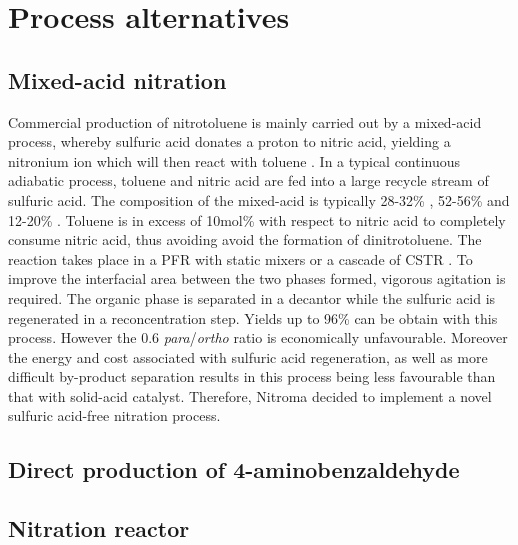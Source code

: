 \section{Process alternatives}
\label{app:alternatives}

\subsection{Mixed-acid nitration}
Commercial production of nitrotoluene is mainly carried out by a mixed-acid process, whereby sulfuric acid donates a proton to nitric acid, yielding a nitronium ion which will then react with toluene \cite{halder_nitration_2007}. In a typical continuous adiabatic process, toluene and nitric acid are fed into a large recycle stream of sulfuric acid. The composition of the mixed-acid is typically 28-32\% , 52-56\%  and 12-20\%  \cite{dugal_nitrobenzene_2005}. Toluene is in excess of 10mol\% with respect to nitric acid to completely consume nitric acid, thus avoiding avoid the formation of dinitrotoluene. The reaction takes place in a PFR with static mixers or a cascade of CSTR \cite{dugal_nitrobenzene_2005}.  To improve the interfacial area between the two phases formed, vigorous agitation is required. The organic phase is separated in a decantor while the sulfuric acid is regenerated in a reconcentration step. Yields up to 96\% can be obtain with this process. However the 0.6 \textit{para}/\textit{ortho} ratio is economically unfavourable. Moreover the energy and cost associated with sulfuric acid regeneration, as well as more difficult by-product separation results in this process being less favourable than that with solid-acid catalyst. Therefore, Nitroma decided to implement a novel sulfuric acid-free nitration process.



\subsection{Direct production of 4-aminobenzaldehyde}


\subsection{Nitration reactor}
\label{nitrationreactor}

